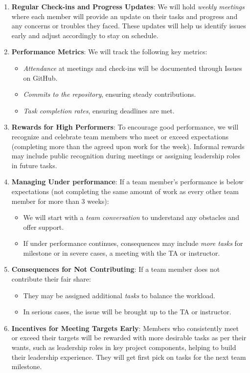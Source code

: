 \documentclass{article}
\begin{document}
\begin{enumerate}
  \item \textbf{Regular Check-ins and Progress Updates}: We will hold
    \textit{weekly meetings} where each member will
    provide an update on their tasks and progress and any concerns or
    troubles they faced. These updates will help us identify issues
    early and adjust accordingly to stay on schedule.
  \item \textbf{Performance Metrics}: We will track the following key metrics:
    \begin{itemize}
      \item \textit{Attendance} at meetings and check-ins will be
        documented through Issues on GitHub.
      \item \textit{Commits to the repository}, ensuring steady contributions.
      \item \textit{Task completion rates}, ensuring deadlines are met.
    \end{itemize}
    \item \textbf{Rewards for High Performers}: To encourage good performance, we will recognize and celebrate team members who meet or exceed expectations (completing more than the agreed upon work for the week). Informal rewards may include public recognition during meetings or assigning leadership roles in future tasks.
    \item \textbf{Managing Under performance}: If a team member's performance is below expectations (not completing the same amount of work as every other team member for more than 3 weeks):
    \begin{itemize}
      \item We will start with a \textit{team conversation} to
        understand any obstacles and offer support.
      \item If under performance continues, consequences may include
        \textit{more tasks} for milestone or in severe cases, a meeting with
        the TA or instructor.
    \end{itemize}
  \item \textbf{Consequences for Not Contributing}: If a team member
    does not contribute their fair share:
    \begin{itemize}
      \item They may be assigned additional \textit{tasks} to balance
        the workload.
      \item In serious cases, the issue will be brought up to the TA
        or instructor.
    \end{itemize}
  \item \textbf{Incentives for Meeting Targets Early}: Members who
    consistently meet or exceed their targets will be rewarded with more
    desirable tasks as per their wants, such as leadership roles in
    key project components, helping to build their leadership experience. They
    will get first pick on tasks for the next team milestone.

\end{enumerate}
\end{document}
